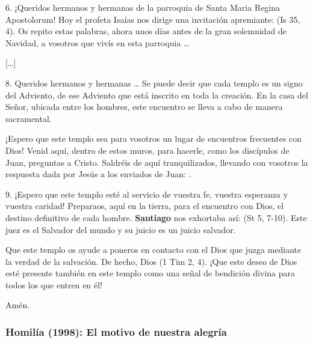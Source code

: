 \begin{body}
					6. ¡Queridos hermanos y hermanas de la parroquia de Santa Maria Regina Apostolorum! Hoy el profeta Isaías nos dirige una invitación apremiante:  (Is 35, 4). Os repito estas palabras, ahora unos días antes de la gran solemnidad de Navidad, a vosotros que vivís en esta parroquia \ldots{}
					
					{[}\ldots{}{]}
					
					8. Queridos hermanos y hermanas \ldots{} Se puede decir que cada templo es un signo del Adviento, de ese Adviento que está inscrito en toda la creación. En la casa del Señor, ubicada entre los hombres, este encuentro se lleva a cabo de manera sacramental.
					
					¡Espero que este templo sea para vosotros un lugar de encuentros frecuentes con Dios! Venid aquí, dentro de estos muros, para hacerle, como los discípulos de Juan, preguntas a Cristo. Saldréis de aquí tranquilizados, llevando con vosotros la respuesta dada por Jesús a los enviados de Juan: .
					
					9. ¡Espero que este templo esté al servicio de vuestra fe, vuestra esperanza y vuestra caridad! Preparaos, aquí en la tierra, para el encuentro con Dios, el destino definitivo de cada hombre. \textbf{Santiago} nos exhortaba así:  (St 5, 7-10). Este juez es el Salvador del mundo y su juicio es un juicio salvador.
					
					Que este templo os ayude a poneros en contacto con el Dios que juzga mediante la verdad de la salvación. De hecho, Dios  (1 Tim 2, 4). ¡Que este deseo de Dios esté presente también en este templo como una señal de bendición divina para todos los que entren en él!
					
					Amén.
				\end{body}

			\subsubsection{Homilía (1998): El motivo de nuestra alegría}
				
